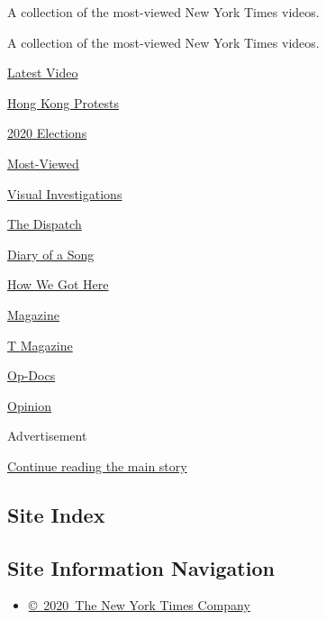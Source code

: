 A collection of the most-viewed New York Times videos.

A collection of the most-viewed New York Times videos.

\href{/video}{}

\href{/video/latest-video}{Latest Video}

\href{/video/hk-protest}{Hong Kong Protests}

\href{/video/2020-Elections}{2020 Elections}

\href{/video/Most-Viewed}{Most-Viewed}

\href{/video/investigations}{Visual Investigations}

\href{/video/on-the-ground}{The Dispatch}

\href{/video/diaryofasong}{Diary of a Song}

\href{/video/how-we-got-here}{How We Got Here}

\href{/video/magazine}{Magazine}

\href{/video/t-magazine}{T Magazine}

\href{/video/op-docs}{Op-Docs}

\href{/video/opinion}{Opinion}

Advertisement

\protect\hyperlink{after-bottom}{Continue reading the main story}

\hypertarget{site-index}{%
\subsection{Site Index}\label{site-index}}

\hypertarget{site-information-navigation}{%
\subsection{Site Information
Navigation}\label{site-information-navigation}}

\begin{itemize}
\tightlist
\item
  \href{https://help.nytimes3xbfgragh.onion/hc/en-us/articles/115014792127-Copyright-notice}{©~2020~The
  New York Times Company}
\end{itemize}

